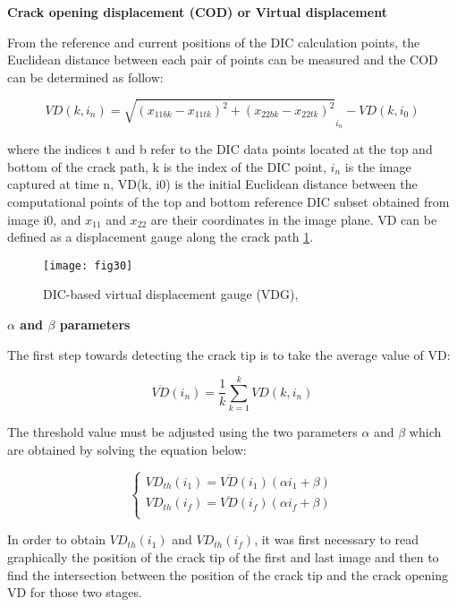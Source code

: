 \textbf{Crack opening displacement (COD) or Virtual displacement}

From the reference and current positions of the DIC calculation points, the Euclidean distance between each pair of points can be measured and the COD can be determined as follow:

\begin{equation}
	VD(k,i_n)=\sqrt{(x_{11bk}-x_{11tk})^2 + (x_{22bk}-x_{22tk})^2}_{i_n} - VD(k,i_0)
\end{equation}

where the indices t and b refer to the DIC data points located at the top and bottom of the crack path, k is the index of the DIC point, $i_n$ is the image captured at time n, VD(k, i0) is the initial Euclidean distance between the computational points of the top and bottom reference DIC subset obtained from image i0, and $x_{11}$ and $x_{22}$ are their coordinates in the image plane. VD can be defined as a displacement gauge along the crack path \ref{fig:fig30}.

\begin{figure}[htp]
	\centering
	\texttt{[image: fig30]}
	\caption{DIC-based virtual displacement gauge (VDG), \cite{FilhoJ2022}}
	\label{fig:fig30}
\end{figure}

\textbf{$\alpha$ and $\beta$ parameters}

The first step towards detecting the crack tip is to take the average value of VD:

\begin{equation}
	\overline{VD}(i_n)=\frac{1}{k} \sum_{k=1}^{k}VD(k,i_n)
\end{equation}

The threshold value must be adjusted using the two parameters $\alpha$ and $\beta$ which are obtained by solving the equation below:

\begin{equation}
	\begin{cases}
		VD_{th}(i_1)=\overline{VD}(i_1)(\alpha i_1 +\beta)\\
		VD_{th}(i_f)=\overline{VD}(i_f)(\alpha i_f +\beta)\\ 
	\end{cases}
\end{equation}

In order to obtain $VD_{th}(i_1)$ and $VD_{th}(i_f)$, it was first necessary to read graphically the position of the crack tip of the first and last image and then to find the intersection between the position of the crack tip and the crack opening VD for those two stages.

